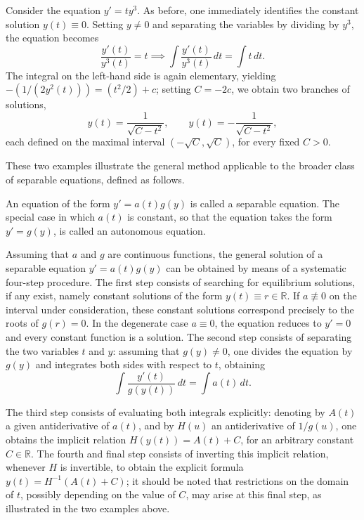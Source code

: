 \begin{example}
Consider the equation $y' = t y^3$. As before, one immediately identifies the constant solution $y(t) \equiv 0$. Setting $y \neq 0$ and separating the variables by dividing by $y^3$, the equation becomes
\[
\frac{y'(t)}{y^3(t)} = t \implies \int \frac{y'(t)}{y^3(t)} \, dt = \int t \, dt.
\]
The integral on the left-hand side is again elementary, yielding $-(1/(2 y^2(t))) = (t^2/2) + c$; setting $C = -2c$, we obtain two branches of solutions,
\[
y(t) = \frac{1}{\sqrt{C - t^2}}, \qquad y(t) = -\frac{1}{\sqrt{C - t^2}},
\] each defined on the maximal interval $(-\sqrt{C}, \sqrt{C})$, for every fixed $C > 0$.
\end{example}

These two examples illustrate the general method applicable to the broader class of separable equations, defined as follows.

\begin{definition}
An equation of the form $y' = a(t) g(y)$ is called a separable equation. The special case in which $a(t)$ is constant, so that the equation takes the form $y' = g(y)$, is called an autonomous equation.
\end{definition}

Assuming that $a$ and $g$ are continuous functions, the general solution of a separable equation $y' = a(t) g(y)$ can be obtained by means of a systematic four-step procedure. The first step consists of searching for equilibrium solutions, if any exist, namely constant solutions of the form $y(t) \equiv r \in \mathbb{R}$. If $a\not\equiv0$ on the interval under consideration, these constant solutions correspond precisely to the roots of $g(r)=0$. In the degenerate case $a\equiv0$, the equation reduces to $y'=0$ and every constant function is a solution. The second step consists of separating the two variables $t$ and $y$: assuming that $g(y) \neq 0$, one divides the equation by $g(y)$ and integrates both sides with respect to $t$, obtaining
\[
\int \frac{y'(t)}{g(y(t))} \, dt = \int a(t) \, dt.
\]

The third step consists of evaluating both integrals explicitly: denoting by $A(t)$ a given antiderivative of $a(t)$, and by $H(u)$ an antiderivative of $1/g(u)$, one obtains the implicit relation $H(y(t)) = A(t) + C$, for an arbitrary constant $C \in \mathbb{R}$. The fourth and final step consists of inverting this implicit relation, whenever $H$ is invertible, to obtain the explicit formula $y(t) = H^{-1}(A(t) + C)$; it should be noted that restrictions on the domain of $t$, possibly depending on the value of $C$, may arise at this final step, as illustrated in the two examples above.

